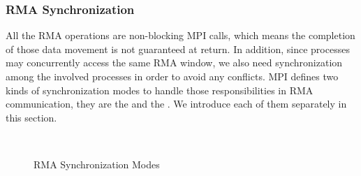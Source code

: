 \subsubsection{RMA Synchronization}

All the RMA operations are non-blocking MPI calls, which means the completion
of those data movement is not guaranteed at return. In addition, since processes
may concurrently access the same RMA window, we also need synchronization
among the involved processes in order to avoid any conflicts. MPI defines two
kinds of synchronization modes to handle those responsibilities in RMA communication,
they are the  and the . We introduce
each of them separately in this section.

\begin{figure}%
\centering
{}
\\
\caption{RMA Synchronization Modes}
\label{fig:back-rma-sync}
\end{figure}

